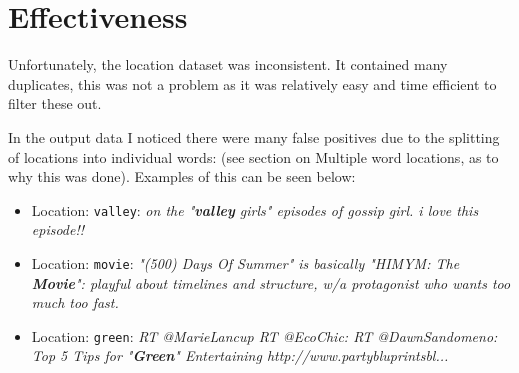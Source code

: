 \documentclass[a4paper]{article}
\begin{document}
\section{Effectiveness}
Unfortunately, the location dataset was inconsistent. It contained many duplicates, this was not a problem as it was relatively easy and time efficient to filter these out.

In the output data I noticed there were many false positives due to the splitting of locations into individual words: (see section on Multiple word locations, as to why this was done). Examples of this can be seen below:
\begin{itemize}
\item Location: \texttt{valley}:  \textit{on the "\textbf{valley} girls" episodes of gossip girl. i love this episode!!}
\item Location: \texttt{movie}:   \textit{"(500) Days Of Summer" is basically "HIMYM: The \textbf{Movie}": playful about timelines and structure, w/a protagonist who wants too much too fast.}
\item Location: \texttt{green}:   \textit{RT @MarieLancup RT @EcoChic: RT @DawnSandomeno: Top 5 Tips for "\textbf{Green}" Entertaining http://www.partybluprintsbl...}
\end{itemize}
\end{document}

